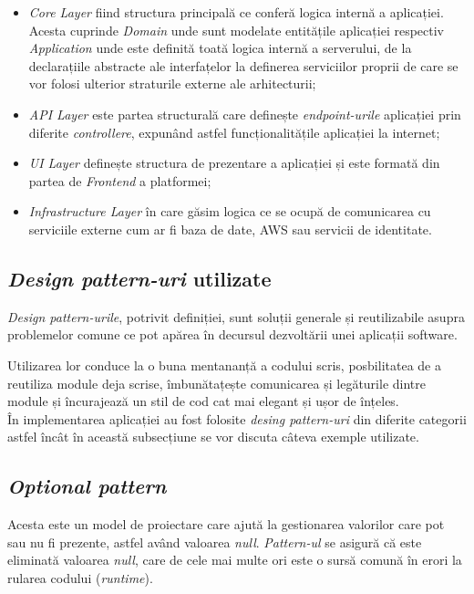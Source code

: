 \begin{itemize}
	\item  \textit{Core Layer} fiind structura principală ce conferă logica internă a aplicației. Acesta cuprinde \textit{Domain} unde sunt modelate entitățile aplicației respectiv \textit{Application} unde este definită toată logica internă a serverului,
	de la declarațiile abstracte ale interfațelor la definerea serviciilor proprii de care se vor folosi ulterior straturile externe ale arhitecturii;
	
	\item \textit{API Layer} este partea structurală care definește \textit{endpoint-urile} aplicației prin diferite \textit{controllere}, expunând astfel funcționalitățile aplicației la internet;
	
  	\item \textit{UI Layer} definește structura de prezentare a aplicației și este formată din partea de \textit{Frontend} a platformei;
  
 	 \item \textit{Infrastructure Layer} în care găsim logica ce se ocupă de comunicarea cu serviciile externe cum ar fi baza de date, AWS sau servicii de identitate.
 	 
\end{itemize}

\subsection*{\textit{Design pattern-uri} utilizate}

\textit{Design pattern-urile}, potrivit definiției, sunt soluții generale și reutilizabile asupra problemelor comune ce pot apărea în decursul dezvoltării unei aplicații software.

Utilizarea lor conduce la o buna mentananță a codului scris, posbilitatea de a reutiliza module deja scrise, îmbunătațește comunicarea și legăturile dintre module și încurajează un stil de cod cat mai elegant și ușor de înțeles.\\
În implementarea aplicației au fost folosite \textit{desing pattern-uri} din diferite categorii astfel încât în această subsecțiune se vor discuta câteva exemple utilizate.

\subsection*{\textit{Optional pattern}}
Acesta este un model de proiectare care ajută la gestionarea valorilor care pot sau nu fi prezente, astfel având valoarea \textit{null}. \textit{Pattern-ul} se asigură că este eliminată valoarea \textit{null}, care de cele mai multe ori este o sursă comună în erori la rularea codului (\textit{runtime}).


